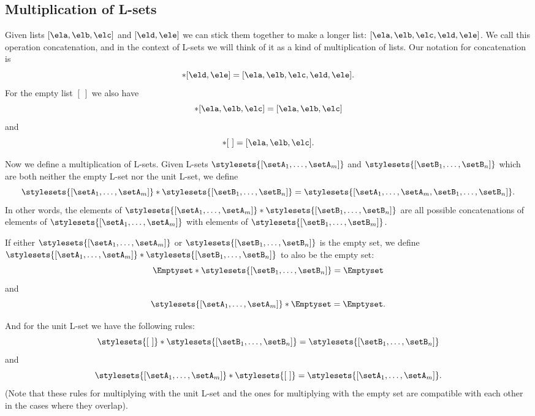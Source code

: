 \subsection{Multiplication of L-sets}

Given lists $[\ela, \elb, \elc]$ and $[\eld, \ele]$ we can stick them together to make a longer list: $[\ela, \elb, \elc, \eld, \ele]$.
We call this operation concatenation, and in the context of L-sets we will think of it as a kind of multiplication of lists.
Our notation for concatenation is
\begin{equation}
    [\ela, \elb, \elc] * [\eld, \ele] = [\ela, \elb, \elc, \eld, \ele].
\end{equation}
For the empty list $[ \ ]$ we also have
\begin{equation}
    [ \ ] * [\ela, \elb, \elc]  = [\ela, \elb, \elc]
\end{equation}
and
\begin{equation}
    [\ela, \elb, \elc]  * [ \ ] = [\ela, \elb, \elc].
\end{equation}

Now we define a multiplication of L-sets.
Given L-sets $\stylesets{[\setA_1, \dots, \setA_m]}$ and $\stylesets{[\setB_1,  \dots, \setB_n]}$ which are both neither the empty L-set nor the unit L-set, we define
\begin{equation}
    \stylesets{[\setA_1, \dots, \setA_m]} * \stylesets{[\setB_1, \dots, \setB_n]} = \stylesets{[\setA_1, \dots, \setA_m, \setB_1,  \dots, \setB_n]}.
\end{equation}
In other words, the elements of $\stylesets{[\setA_1, \dots, \setA_m]} * \stylesets{[\setB_1, \dots, \setB_n]}$ are all possible concatenations of elements of $\stylesets{[\setA_1, \dots, \setA_m]}$ with elements of $\stylesets{[\setB_1, \dots, \setB_m]}$.

If either $\stylesets{[\setA_1, \dots, \setA_m]}$ or $\stylesets{[\setB_1, \dots, \setB_n]}$ is the empty set, we define $\stylesets{[\setA_1, \dots, \setA_m]} * \stylesets{[\setB_1, \dots, \setB_n]}$ to also be the empty set:
\begin{equation}
    \Emptyset * \stylesets{[\setB_1, \dots, \setB_n]} = \Emptyset
\end{equation}
and
\begin{equation}
    \stylesets{[\setA_1, \dots, \setA_m]} * \Emptyset = \Emptyset.
\end{equation}

And for the unit L-set we have the following rules:
\begin{equation}
    \stylesets{[ \ ]} * \stylesets{[\setB_1, \dots, \setB_n]} = \stylesets{[\setB_1,  \dots, \setB_n]}
\end{equation}
and
\begin{equation}
    \stylesets{[\setA_1, \dots, \setA_m]} * \stylesets{[ \ ]} = \stylesets{[\setA_1, \dots, \setA_m]}.
\end{equation}
(Note that these rules for multiplying with the unit L-set and the ones for multiplying with the empty set are compatible with each other in the cases where they overlap).

